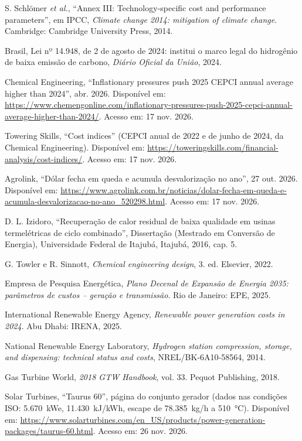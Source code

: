  S. Schlömer \textit{et al.}, ``Annex III: Technology-specific cost and performance parameters'', em IPCC, \textit{Climate change 2014: mitigation of climate change}. Cambridge: Cambridge University Press, 2014.

 Brasil, Lei nº 14.948, de 2 de agosto de 2024: institui o marco legal do hidrogênio de baixa emissão de carbono, \textit{Diário Oficial da União}, 2024.

 Chemical Engineering, ``Inflationary pressures push 2025 CEPCI annual average higher than 2024'', abr. 2026. Disponível em: \url{https://www.chemengonline.com/inflationary-pressures-push-2025-cepci-annual-average-higher-than-2024/}. Acesso em: 17 nov. 2026.

 Towering Skills, ``Cost indices'' (CEPCI anual de 2022 e de junho de 2024, da Chemical Engineering). Disponível em: \url{https://toweringskills.com/financial-analysis/cost-indices/}. Acesso em: 17 nov. 2026.

 Agrolink, ``Dólar fecha em queda e acumula desvalorização no ano'', 27 out. 2026. Disponível em: \url{https://www.agrolink.com.br/noticias/dolar-fecha-em-queda-e-acumula-desvalorizacao-no-ano_520298.html}. Acesso em: 17 nov. 2026.

 D. L. Izidoro, ``Recuperação de calor residual de baixa qualidade em usinas termelétricas de ciclo combinado'', Dissertação (Mestrado em Conversão de Energia), Universidade Federal de Itajubá, Itajubá, 2016, cap. 5.

 G. Towler e R. Sinnott, \textit{Chemical engineering design}, 3. ed. Elsevier, 2022.

 Empresa de Pesquisa Energética, \textit{Plano Decenal de Expansão de Energia 2035: parâmetros de custos -- geração e transmissão}. Rio de Janeiro: EPE, 2025.

 International Renewable Energy Agency, \textit{Renewable power generation costs in 2024}. Abu Dhabi: IRENA, 2025.

 National Renewable Energy Laboratory, \textit{Hydrogen station compression, storage, and dispensing: technical status and costs}, NREL/BK-6A10-58564, 2014.

 Gas Turbine World, \textit{2018 GTW Handbook}, vol. 33. Pequot Publishing, 2018.

 Solar Turbines, ``Taurus 60'', página do conjunto gerador (dados nas condições ISO: 5.670~kWe, 11.430~kJ/kWh, escape de 78.385~kg/h a 510~°C). Disponível em: \url{https://www.solarturbines.com/en_US/products/power-generation-packages/taurus-60.html}. Acesso em: 26 nov. 2026.


